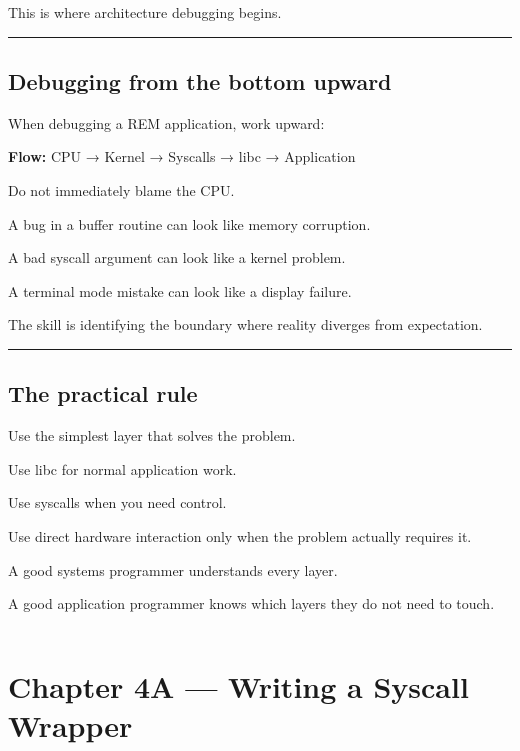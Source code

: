 \documentclass[
  oneside,
  openany]{book}
\begin{document}
This is where architecture debugging begins.

\begin{center}\rule{0.5\linewidth}{0.5pt}\end{center}

\hypertarget{debugging-from-the-bottom-upward}{%
\section{Debugging from the bottom
upward}\label{debugging-from-the-bottom-upward}}

When debugging a REM application, work upward:

\textbf{Flow:} CPU → Kernel → Syscalls → libc → Application

Do not immediately blame the CPU.

A bug in a buffer routine can look like memory corruption.

A bad syscall argument can look like a kernel problem.

A terminal mode mistake can look like a display failure.

The skill is identifying the boundary where reality diverges from
expectation.

\begin{center}\rule{0.5\linewidth}{0.5pt}\end{center}

\hypertarget{the-practical-rule}{%
\section{The practical rule}\label{the-practical-rule}}

Use the simplest layer that solves the problem.

Use libc for normal application work.

Use syscalls when you need control.

Use direct hardware interaction only when the problem actually requires
it.

A good systems programmer understands every layer.

A good application programmer knows which layers they do not need to
touch.

\begin{verbatim}

\end{verbatim}

\hypertarget{chapter-4a-writing-a-syscall-wrapper}{%
\chapter{Chapter 4A --- Writing a Syscall
Wrapper}\label{chapter-4a-writing-a-syscall-wrapper}}
\end{document}
